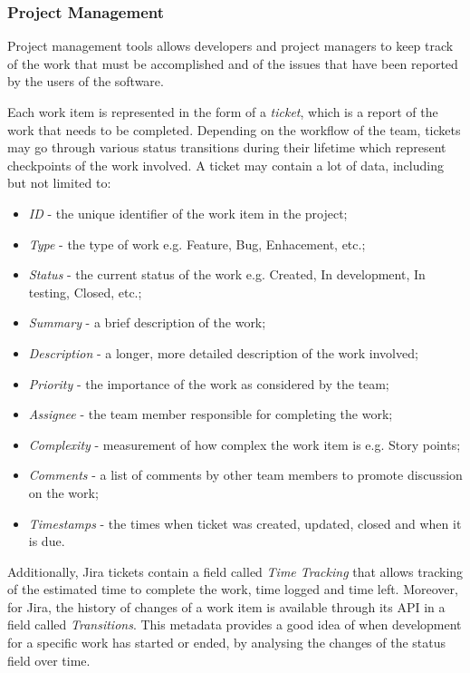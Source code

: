 \documentclass{mpaper}
\begin{document}
\subsubsection*{Project Management}
\label{project-management}

Project management tools allows developers and project managers to keep track of
the work that must be accomplished and of the issues that have been reported by
the users of the software. 

Each work item is represented in the form of a \emph{ticket}, which is a report
of the work that needs to be completed. Depending on the workflow of the team,
tickets may go through various status transitions during their lifetime which
represent checkpoints of the work involved. A ticket may contain a lot of data,
including but not limited to:

\begin{itemize}
  \item \emph{ID} - the unique identifier of the work item in the project;
  \item \emph{Type} - the type of work e.g. Feature, Bug, Enhacement, etc.;
  \item \emph{Status} - the current status of the work e.g. Created, In
  development, In testing, Closed, etc.;
  \item \emph{Summary} - a brief description of the work;
  \item \emph{Description} - a longer, more detailed description of the work
  involved;
  \item \emph{Priority} - the importance of the work as considered by the team;
  \item \emph{Assignee} - the team member responsible for completing the work;
  \item \emph{Complexity} - measurement of how complex the work item is e.g.
  Story points;
  \item \emph{Comments} - a list of comments by other team members to promote
  discussion on the work;
  \item \emph{Timestamps} - the times when ticket was created, updated, closed
  and when it is due. 
\end{itemize}

Additionally, Jira tickets contain a field called \emph{Time Tracking} that
allows tracking of the estimated time to complete the work, time logged and time
left. Moreover, for Jira, the history of changes of a work item is available
through its API in a field called \emph{Transitions}. This metadata provides a
good idea of when development for a specific work has started or ended, by
analysing the changes of the status field over time. 
\end{document}

